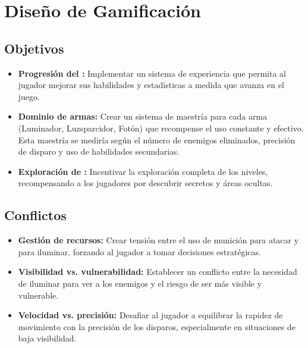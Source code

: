 \section{Diseño de Gamificación}
    \subsection{Objetivos}
    \begin{itemize}
        \item \textbf{Progresión del \hunter:} Implementar un sistema de experiencia que permita al jugador mejorar sus habilidades y estadísticas a medida que avanza en el juego.
        \item \textbf{Dominio de armas:} Crear un sistema de maestría para cada arma (Luminador, Luzsparcidor, Fotón) que recompense el uso constante y efectivo. Esta maestría se mediría según el número de enemigos eliminados, precisión de disparo y uso de habilidades secundarias.
        \item \textbf{Exploración de \hole:} Incentivar la exploración completa de los niveles, recompensando a los jugadores por descubrir secretos y áreas ocultas.
    \end{itemize}

    \subsection{Conflictos}
    \begin{itemize}
        \item \textbf{Gestión de recursos:} Crear tensión entre el uso de munición para atacar y para iluminar, forzando al jugador a tomar decisiones estratégicas.
        \item \textbf{Visibilidad vs. vulnerabilidad:} Establecer un conflicto entre la necesidad de iluminar para ver a los enemigos y el riesgo de ser más visible y vulnerable.
        \item \textbf{Velocidad vs. precisión:} Desafiar al jugador a equilibrar la rapidez de movimiento con la precisión de los disparos, especialmente en situaciones de baja visibilidad.
    \end{itemize}

